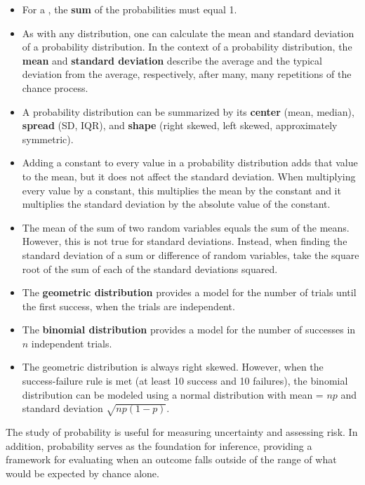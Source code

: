 \begin{itemize}
\item For a , the \textbf{sum} of the probabilities must equal 1.  
\item As with any distribution, one can calculate the mean and standard deviation of a probability distribution.  In the context of a probability distribution, the \textbf{mean} and \textbf{standard deviation} describe the average and the typical  deviation from the average, respectively, after many, many repetitions of the chance process.  

\item A probability distribution can be summarized by its \textbf{center} (mean, median), \textbf{spread} (SD, IQR), and \textbf{shape} (right skewed, left skewed, approximately symmetric).  

\item Adding a constant to every value in a probability distribution adds that value to the mean, but it does not affect the standard deviation. When multiplying every value by a constant, this multiplies the mean by the constant and it multiplies the standard deviation by the absolute value of the
constant.

\item The mean of the sum of two random variables equals the sum of the means.  However, this is not true for standard deviations.  Instead, when finding the standard deviation of a sum or difference of random variables, take the square root of the sum of each of the standard deviations squared.

\item The \textbf{geometric distribution} provides a model for the number of trials until the first success, when the trials are independent.
\item The \textbf{binomial distribution} provides a model for the number of successes in $n$ independent trials.
\item The geometric distribution is always right skewed.  However, when the success-failure rule is met (at least 10 success and 10 failures), the binomial distribution can be modeled using a normal distribution with mean = $np$ and standard deviation $\sqrt{np(1-p)}$. 

\end{itemize}
The study of probability is useful for measuring uncertainty and assessing risk.  In addition, probability serves as the foundation for inference, providing a framework for evaluating when an outcome falls outside of the range of what would be expected by chance alone.

